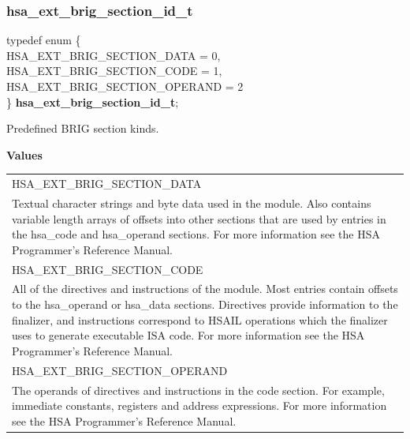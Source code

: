 \documentclass[final,oneside]{book}
\newcommand{\reftyp}[1]{#1}
\newcommand{\refenu}[1]{\reftyp{#1}}
\newenvironment{mylongtable}{\rowcolors{0}{lightgray}{lightgray}\longtable} {
\endlongtable}
\begin{document}
\subsubsection{hsa_\-ext_\-brig_\-section_\-id_\-t}
\vspace{-5.5mm}\begin{mylongtable}{@{}p{\textwidth}}
\rule{0pt}{3ex}typedef enum \{\\\hspace{1.7em}\hypertarget{group__ext-finalizer_1gga3060576486841364f0842a76810aea06a9b040e9aae3efa23134666d054a3a839}{\refenu{HSA_\-EXT_\-BRIG_\-SECTION_\-DATA}} = 0,\\
\hspace{1.7em}\hypertarget{group__ext-finalizer_1gga3060576486841364f0842a76810aea06a43997c8d8ab6c03c301c949bdb1819c7}{\refenu{HSA_\-EXT_\-BRIG_\-SECTION_\-CODE}} = 1,\\
\hspace{1.7em}\hypertarget{group__ext-finalizer_1gga3060576486841364f0842a76810aea06ae52428f823f64d4ad9a0d8e2e29aea0b}{\refenu{HSA_\-EXT_\-BRIG_\-SECTION_\-OPERAND}} = 2\\
\} \hypertarget{group__ext-finalizer_1ga3060576486841364f0842a76810aea06}{\textbf{hsa_\-ext_\-brig_\-section_\-id_\-t}};\rule[-2ex]{0pt}{0pt}\end{mylongtable}
\vspace{-5mm}Predefined BRIG section kinds.

\noindent\textbf{Values}\\[-5mm]
\begin{longtable}{@{\hspace{2em}}p{\linewidth-2em}}
\hspace{-2em}\refenu{HSA_\-EXT_\-BRIG_\-SECTION_\-DATA}\\Textual character strings and byte data used in the module. Also contains variable length arrays of offsets into other sections that are used by entries in the hsa_\-code and hsa_\-operand sections. For more information see the HSA Programmer's Reference Manual.\\[2mm]
\hspace{-2em}\refenu{HSA_\-EXT_\-BRIG_\-SECTION_\-CODE}\\All of the directives and instructions of the module. Most entries contain offsets to the hsa_\-operand or hsa_\-data sections. Directives provide information to the finalizer, and instructions correspond to HSAIL operations which the finalizer uses to generate executable ISA code. For more information see the HSA Programmer's Reference Manual.\\[2mm]
\hspace{-2em}\refenu{HSA_\-EXT_\-BRIG_\-SECTION_\-OPERAND}\\The operands of directives and instructions in the code section. For example, immediate constants, registers and address expressions. For more information see the HSA Programmer's Reference Manual.
\end{longtable}
\end{document}
